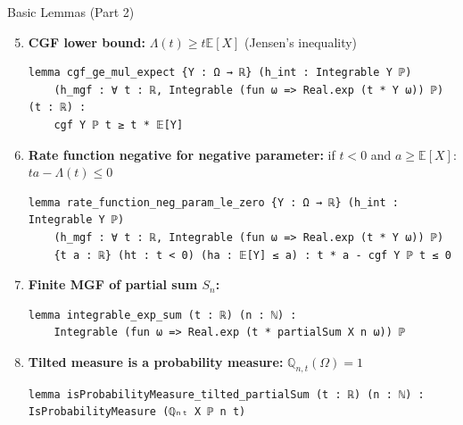 \documentclass[aspectratio=169]{beamer}
\newcommand{\E}{\mathbb{E}}
\newcommand{\Q}{\mathbb{Q}}
\begin{document}
\begin{frame}[fragile]{Basic Lemmas (Part 2)}
  \begin{enumerate}\setcounter{enumi}{4}
    \item \textbf{CGF lower bound:} $\Lambda(t) \ge t\E[X]$ \quad (Jensen's inequality)
\begin{lstlisting}[basicstyle=\ttfamily\tiny]
lemma cgf_ge_mul_expect {Y : Ω → ℝ} (h_int : Integrable Y ℙ)
    (h_mgf : ∀ t : ℝ, Integrable (fun ω => Real.exp (t * Y ω)) ℙ) (t : ℝ) :
    cgf Y ℙ t ≥ t * 𝔼[Y]
\end{lstlisting}
    \item \textbf{Rate function negative for negative parameter:} if $t < 0$ and $a \ge \E[X]$: $ta - \Lambda(t) \le 0$
\begin{lstlisting}[basicstyle=\ttfamily\tiny]
lemma rate_function_neg_param_le_zero {Y : Ω → ℝ} (h_int : Integrable Y ℙ)
    (h_mgf : ∀ t : ℝ, Integrable (fun ω => Real.exp (t * Y ω)) ℙ)
    {t a : ℝ} (ht : t < 0) (ha : 𝔼[Y] ≤ a) : t * a - cgf Y ℙ t ≤ 0
\end{lstlisting}
    \item \textbf{Finite MGF of partial sum $S_n$:}
\begin{lstlisting}[basicstyle=\ttfamily\tiny]
lemma integrable_exp_sum (t : ℝ) (n : ℕ) :
    Integrable (fun ω => Real.exp (t * partialSum X n ω)) ℙ
\end{lstlisting}
    \item \textbf{Tilted measure is a probability measure:} $\Q_{n,t}(\Omega) = 1$
\begin{lstlisting}[basicstyle=\ttfamily\tiny]
lemma isProbabilityMeasure_tilted_partialSum (t : ℝ) (n : ℕ) : IsProbabilityMeasure (ℚₙₜ X ℙ n t)
\end{lstlisting}
  \end{enumerate}
\end{frame}
\end{document}
